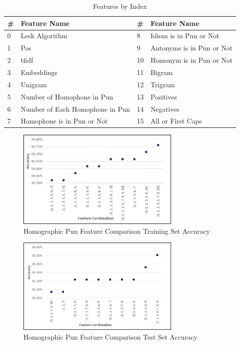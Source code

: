 \documentclass{article}
\begin{document}
\begin{table}
\caption{Features by Index}\label{tab:List_of_features} 
\begin{center}
\begin{tabular}{l l l l} 
\toprule
\textbf{\#} &\textbf{Feature Name}		& \textbf{\#} &	\textbf{Feature Name}\\
\midrule
0	&	Lesk Algorithm					& 8		&	Idiom is in Pun or Not\\
1	&	Pos								& 9		&	Antonyms is in Pun or Not\\
2	&	tfidf							& 10	&	Homonym is in Pun or Not\\
3	&	Embeddings						& 11	&	Bigram\\
4	&	Unigram							& 12	&	Trigram\\
5	&	Number of Homophone in Pun		& 13	&	Positives\\
6	&	Number of Each Homophone in Pun & 14	&	Negatives\\
7	&	Homophone is in Pun or Not		& 15	&	All or First Caps\\
\bottomrule
\end{tabular}
\end{center}
\end{table}

\begin{figure}
  \centering
  \includegraphics[width=8cm]{figures/Accuracy_on_Training_Set_for_Homographic_Pun.png}
  \caption{Homographic Pun Feature Comparison Training Set Accuracy}\label{fig:ACC_Train_Homo}
\end{figure}

\begin{figure}
  \centering
  \includegraphics[width=8cm]{figures/Accuracy_on_Test_Set_for_Homographic_Pun.png}
  \caption{Homographic Pun Feature Comparison Test Set Accuracy}\label{fig:ACC_Test_Homo}
\end{figure}
\end{document}
